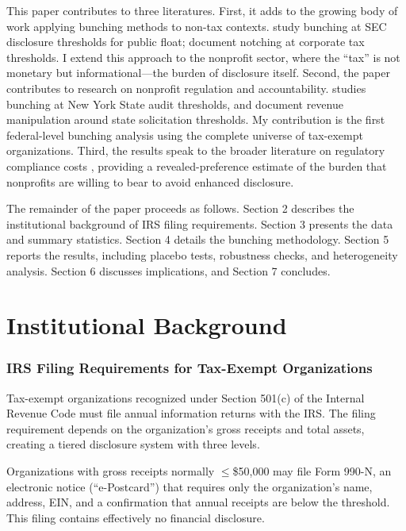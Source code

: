 \documentclass[12pt]{article}
\begin{document}
This paper contributes to three literatures. First, it adds to the growing body of work applying bunching methods to non-tax contexts. \citet{ewens2024startup} study bunching at SEC disclosure thresholds for public float; \citet{chen2020notching} document notching at corporate tax thresholds. I extend this approach to the nonprofit sector, where the ``tax'' is not monetary but informational---the burden of disclosure itself. Second, the paper contributes to research on nonprofit regulation and accountability. \citet{yildirim2018agency} studies bunching at New York State audit thresholds, and \citet{gordon2009manipulation} document revenue manipulation around state solicitation thresholds. My contribution is the first federal-level bunching analysis using the complete universe of tax-exempt organizations. Third, the results speak to the broader literature on regulatory compliance costs \citep{djankov2002regulation, crain2010impact}, providing a revealed-preference estimate of the burden that nonprofits are willing to bear to avoid enhanced disclosure.

The remainder of the paper proceeds as follows. Section 2 describes the institutional background of IRS filing requirements. Section 3 presents the data and summary statistics. Section 4 details the bunching methodology. Section 5 reports the results, including placebo tests, robustness checks, and heterogeneity analysis. Section 6 discusses implications, and Section 7 concludes.

\section{Institutional Background}

\subsubsection*{IRS Filing Requirements for Tax-Exempt Organizations} Tax-exempt organizations recognized under Section 501(c) of the Internal Revenue Code must file annual information returns with the IRS. The filing requirement depends on the organization's gross receipts and total assets, creating a tiered disclosure system with three levels.

Organizations with gross receipts normally $\leq$\$50,000 may file Form 990-N, an electronic notice (``e-Postcard'') that requires only the organization's name, address, EIN, and a confirmation that annual receipts are below the threshold. This filing contains effectively no financial disclosure.
\end{document}
